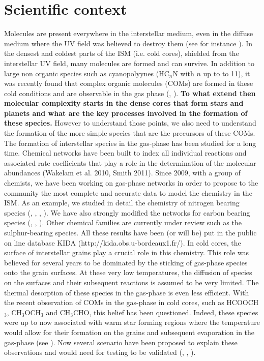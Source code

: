 \section{Scientific context} 


Molecules are present everywhere in the interstellar medium, even in the diffuse medium where the UV field was believed to destroy them (see for instance \cite{2012ApJ...753L..28L}). In the densest and coldest parts of the ISM (i.e. cold cores), shielded from the interstellar UV field, many molecules are formed and can survive. In addition to large non organic species such as cyanopolyynes (HC$_n$N with $n$ up to to 11), it was recently found that complex organic molecules (COMs) are formed in these cold conditions and are observable in the gas phase (\cite{Bacmann_2012}, \cite{2014ApJ...795L...2V}). \textbf{To what extend then molecular complexity starts in the dense cores that form stars and planets and what are the key processes involved in the formation of these species.} However to understand those points, we also need to understand the formation of the more simple species that are the precursors of these COMs. \\
The formation of interstellar species in the gas-phase has been studied for a long time. Chemical networks have been built to index all individual reactions and associated rate coefficients that play a role in the determination of the molecular abundances (Wakelam et al. 2010, Smith 2011). Since 2009, with a group of chemists, we have been working on gas-phase networks in order to propose to the community the most complete and accurate data to model the chemistry in the ISM. As an example, we studied in detail the chemistry of nitrogen bearing species (\cite{2013PCCP...1513888D}, \cite{2012PNAS..10910233D}, \cite{2014MNRAS.443..398L}, \cite{2013arXiv1310.4350W}). We have also strongly modified the networks for carbon bearing species (\cite{Wakelam_2009}, \cite{2014MNRAS.437..930L}, \cite{2015MNRAS.453L..48W}). Other chemical families are currently under review such as the sulphur-bearing species. All these results have been (or will be) put in the public on line database KIDA (http://kida.obs.u-bordeaux1.fr/).
In cold cores, the surface of interstellar grains play a crucial role in this chemistry. This role was believed for several years to be dominated by the sticking of gas-phase species onto the grain surfaces. At these very low temperatures, the diffusion of species on the surfaces and their subsequent reactions is assumed to be very limited. The thermal desorption of these species in the gas-phase is even less efficient. With the recent observation of COMs in the gas-phase in cold cores, such as HCOOCH$_3$, CH$_3$OCH$_3$ and CH$_3$CHO, this belief has been questioned. Indeed, these species were up to now associated with warm star forming regions where the temperature would allow for their formation on the grains and subsequent evaporation in the gas-phase (see \cite{Herbst_2009}). Now several scenario have been proposed to explain these observations and would need for testing to be validated (\cite{2013ApJ...769...34V}, \cite{2015MNRAS.449L..16B}, \cite{2015MNRAS.447.4004R}).



